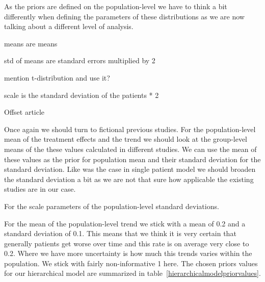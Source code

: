 \documentclass[12pt,a4paper,leqno]{report}
\theoremstyle{plain}
\theoremstyle{definition}
\theoremstyle{remark}
\begin{document}

As the priors are defined on the population-level we have to think a bit differently when defining the
parameters of these distributions as we are now talking about
a different level of analysis.

means are means

std of means are standard errors multiplied by 2

mention t-distribution and use it?

scale is the standard deviation of the patients * 2

Offset article \cite{offset}


Once again we should turn to fictional previous studies.
For the population-level mean of the treatment effects and the trend we should look at the
group-level means of the these values calculated in different studies. We can use the
mean of these values as the prior for population mean and their standard deviation for
the standard deviation. Like was the case in single patient model we should broaden the
standard deviation a bit as we are not that sure how applicable the existing studies are in our case.

For the scale parameters of the population-level standard deviations.

For the mean of the population-level trend we stick with a mean of 0.2 and a standard
deviation of 0.1. This means that we think it is very certain that generally patients
get worse over time and this rate is on average very close to 0.2. Where we have more
uncertainty is how much this trends varies within the population. We stick with fairly
non-informative 1 here. The chosen priors values for our hierarchical
model are summarized in table\ \ref{hierarchicalmodelpriorvalues}.
\end{document}
